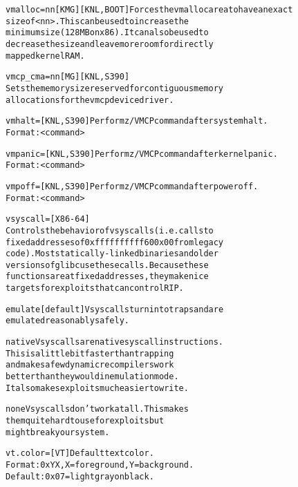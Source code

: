 \documentclass[a4paper,8pt,english]{sphinxmanual}
\begin{document}
\begin{alltt}
        vmalloc=nn{[}KMG{]} {[}KNL,BOOT{]} Forces the vmalloc area to have an exact
                        size of \textless{}nn\textgreater{}. This can be used to increase the
                        minimum size (128MB on x86). It can also be used to
                        decrease the size and leave more room for directly
                        mapped kernel RAM.

        vmcp\_cma=nn{[}MG{]} {[}KNL,S390{]}
                        Sets the memory size reserved for contiguous memory
                        allocations for the vmcp device driver.

        vmhalt=         {[}KNL,S390{]} Perform z/VM CP command after system halt.
                        Format: \textless{}command\textgreater{}

        vmpanic=        {[}KNL,S390{]} Perform z/VM CP command after kernel panic.
                        Format: \textless{}command\textgreater{}

        vmpoff=         {[}KNL,S390{]} Perform z/VM CP command after power off.
                        Format: \textless{}command\textgreater{}

        vsyscall=       {[}X86-64{]}
                        Controls the behavior of vsyscalls (i.e. calls to
                        fixed addresses of 0xffffffffff600x00 from legacy
                        code).  Most statically-linked binaries and older
                        versions of glibc use these calls.  Because these
                        functions are at fixed addresses, they make nice
                        targets for exploits that can control RIP.

                        emulate     {[}default{]} Vsyscalls turn into traps and are
                                    emulated reasonably safely.

                        native      Vsyscalls are native syscall instructions.
                                    This is a little bit faster than trapping
                                    and makes a few dynamic recompilers work
                                    better than they would in emulation mode.
                                    It also makes exploits much easier to write.

                        none        Vsyscalls don't work at all.  This makes
                                    them quite hard to use for exploits but
                                    might break your system.

        vt.color=       {[}VT{]} Default text color.
                        Format: 0xYX, X = foreground, Y = background.
                        Default: 0x07 = light gray on black.


\end{alltt}
\end{document}
